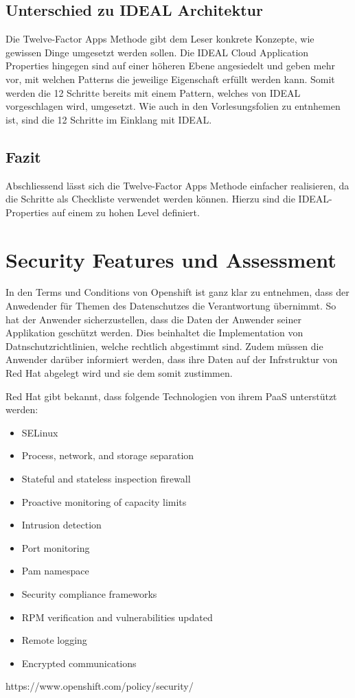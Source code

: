 \documentclass[12pt,a4paper]{article}
\begin{document}
\subsection{Unterschied zu IDEAL Architektur}

Die Twelve-Factor Apps Methode gibt dem Leser konkrete Konzepte, wie gewissen Dinge umgesetzt werden sollen. Die IDEAL Cloud Application
Properties hingegen sind auf einer höheren Ebene angesiedelt und geben mehr vor, mit welchen Patterns die jeweilige Eigenschaft erfüllt werden kann.
Somit werden die 12 Schritte bereits mit einem Pattern, welches von IDEAL vorgeschlagen wird, umgesetzt. Wie auch in den Vorlesungsfolien zu entnhemen ist,
sind die 12 Schritte im Einklang mit IDEAL.

\subsection{Fazit}
Abschliessend lässt sich die Twelve-Factor Apps Methode einfacher realisieren, da die Schritte als Checkliste verwendet werden können.
Hierzu sind die IDEAL-Properties auf einem zu hohen Level definiert.

\section{Security Features und Assessment}

In den Terms und Conditions von Openshift ist ganz klar zu entnehmen, dass der Anwedender für Themen des Datenschutzes die Verantwortung übernimmt.
So hat der Anwender sicherzustellen, dass die Daten der Anwender seiner Applikation geschützt werden. Dies beinhaltet die Implementation von
Datnschutzrichtlinien, welche rechtlich abgestimmt sind. Zudem müssen die Anwender darüber informiert werden, dass ihre Daten auf der Infrstruktur
von Red Hat abgelegt wird und sie dem somit zustimmen.

Red Hat gibt bekannt, dass folgende Technologien von ihrem PaaS unterstützt werden:

\begin{itemize}
    \item SELinux
    \item Process, network, and storage separation
    \item Stateful and stateless inspection firewall
    \item Proactive monitoring of capacity limits
    \item Intrusion detection
    \item Port monitoring
    \item Pam namespace
    \item Security compliance frameworks
    \item RPM verification and vulnerabilities updated
    \item Remote logging
    \item Encrypted communications
\end{itemize}
https://www.openshift.com/policy/security/
\end{document}
